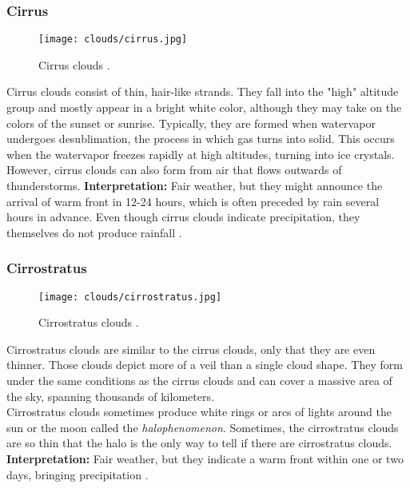 \pagebreak

\subsubsection{Cirrus}
\begin{wrapfigure}[10]{r}{6cm}
    \vspace{-\baselineskip}
    \texttt{[image: clouds/cirrus.jpg]}
    \caption{Cirrus clouds \protect\cite{cloudtypes:wiki:cirrus}.}
    \label{img:clouds:cirrus}
\end{wrapfigure}
Cirrus clouds consist of thin, hair-like strands.
They fall into the "high" altitude group and mostly appear in a bright white color, although they may take on the colors of the sunset or sunrise.
Typically, they are formed when \gls{watervapor} undergoes \gls{desublimation}, the process in which gas turns into solid. This occurs when the \gls{watervapor} freezes rapidly at high altitudes, turning into ice crystals.
\\
\noindent
However, cirrus clouds can also form from air that flows outwards of thunderstorms.
\emptyline
\textbf{Interpretation:} Fair weather, but they might announce the arrival of warm front in 12-24 hours, which is often preceded by rain several hours in advance.
Even though cirrus clouds indicate \gls{precipitation}, they themselves do not produce rainfall \cite{predict:weather}.

\subsubsection{Cirrostratus}
\begin{wrapfigure}[10]{r}{6cm}
    \vspace{-\baselineskip}
    \texttt{[image: clouds/cirrostratus.jpg]}
    \caption{Cirrostratus clouds \protect\cite{cloudtypes:wiki:cirrostratus}.}
    \label{img:clouds:cirrostratus}
\end{wrapfigure}
Cirrostratus clouds are similar to the cirrus clouds, only that they are even thinner.
Those clouds depict more of a veil than a single cloud shape.
They form under the same conditions as the cirrus clouds and can cover a massive area of the sky, spanning thousands of kilometers.
\\
\noindent
Cirrostratus clouds sometimes produce white rings or arcs of lights around the sun or the moon called the \emph{\gls{halophenomenon}}.
Sometimes, the cirrostratus clouds are so thin that the halo is the only way to tell if there are cirrostratus clouds.
\emptyline
\textbf{Interpretation:} Fair weather, but they indicate a warm front within one or two days, bringing \gls{precipitation} \cite{cloudtypes:meteoblue}.


